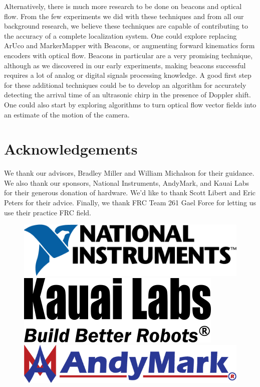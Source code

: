 \documentclass{article}
\begin{document}
  Alternatively, there is much more research to be done on beacons and optical flow. From the few experiments we did with these techniques and from all our background research, we believe these techniques are capable of contributing to the accuracy of a complete localization system. One could explore replacing ArUco and MarkerMapper with Beacons, or augmenting forward kinematics form encoders with optical flow. Beacons in particular are a very promising technique, although as we discovered in our early experiments, making beacons successful requires a lot of analog or digital signals processing knowledge. A good first step for these additional techniques could be to develop an algorithm for accurately detecting the arrival time of an ultrasonic chirp in the presence of Doppler shift. One could also start by exploring algorithms to turn optical flow vector fields into an estimate of the motion of the camera.




\section{Acknowledgements}

  We thank our advisors, Bradley Miller and William Michalson for their guidance. We also thank our sponsors, National Instruments, AndyMark, and Kauai Labs for their generous donation of hardware. We'd like to thank Scott Libert and Eric Peters for their advice. Finally, we thank FRC Team 261 Gael Force for letting us use their practice FRC field.

  \begin{figure}[H]
    \centering
    \includegraphics[width=0.30\linewidth]{./images/ni_logo_2c.png}
    \hspace*{0.1in}
    \includegraphics[width=0.25\linewidth]{./images/Logo_Type_KauaiLabs_BuildBetterRobots_TrademarkSmaller.png}
    \hspace*{0.1in}
    \includegraphics[width=0.30\linewidth]{./images/AndyMark_MedWeb.jpg}
    \caption*{}
    \label{fig:sponsors}
  \end{figure}
\end{document}
